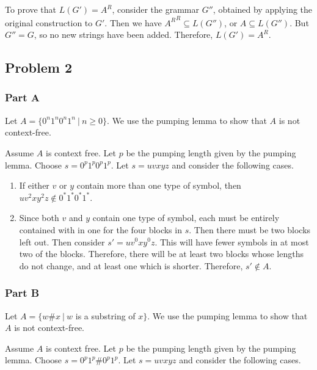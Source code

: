 \documentclass[12pt]
{article}
\newcommand\prob[1]{\noindent{\em #1 }\vspace{2mm}}
\def\mt{\mathtt}
\def\h{\ensuremath{\mt{\#}}}
\begin{document}
To prove that $L(G') = A^R$, consider the grammar $G''$, obtained by
applying the original construction to $G'$.  Then we have ${A^R}^R
\subseteq L(G'')$, or $A \subseteq L(G'')$. But $G'' = G$, so no new
strings have been added.  Therefore,  $L(G') = A^R$.

\subsection*{Problem 2}

\prob{Sipser 2.18 (a,c)}

\subsubsection*{Part A}

Let $A = \{0^n1^n0^n1^n~|~n\geq 0\}$.  We use the pumping lemma to
show that $A$ is not context-free.  

Assume $A$ is context free.  Let $p$ be the pumping length given by
the pumping lemma.  Choose $s = 0^p1^p0^p1^p$.  Let $s = uvxyz$ and
consider the following cases.  

\begin{enumerate}
  \item If either $v$ or $y$ contain more than one type of symbol,
  then $uv^2xy^2z \not\in 0^*1^*0^*1^*$.  

\item Since both $v$ and $y$ contain one type of symbol, each must be
  entirely contained with in one for the four blocks in $s$.  Then
  there must be two blocks left out.  Then consider $s' = uv^0xy^0z$.  This
  will have fewer symbols in at most two of the blocks.  Therefore,
  there will be at least two blocks whose lengths do not change, and
  at least one which is shorter.  Therefore, $s' \not\in A$.  
\end{enumerate} 

\subsubsection*{Part B}

Let $A = \{w\h x~|~w$ is a substring of $x \}$.  We use the pumping
lemma to show that $A$ is not context-free.

Assume $A$ is context free.  Let $p$ be the pumping length given by
the pumping lemma.  Choose $s = 0^p1^p\h 0^p1^p$.  Let $s = uvxyz$ and
consider the following cases.  
\end{document}
